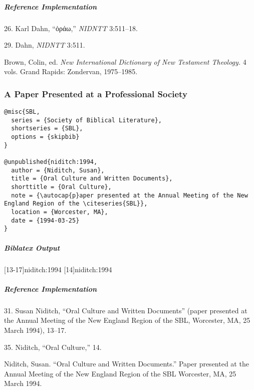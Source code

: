 \documentclass[a4paper]{article}
\newcommand{\textgreek}[1]{{\greekfont #1}}
\newenvironment{biboutput}{%
  \subparagraph{Biblatex Output}
}{\color{black}}
\newenvironment{refimp}{%
  \subparagraph{Reference Implementation}
  \color{reference-colour}
  \rm
}{\par\color{black}}
\begin{document}
\begin{refimp}
  \hspace*{\bibindent}26. Karl Dahn, “\textgreek{ὁράω},” \emph{NIDNTT} 3:511–18.

  \hspace*{\bibindent}29. Dahn, \emph{NIDNTT} 3:511.

  \hangindent\bibindent Brown, Colin, ed. \emph{New International Dictionary
  of New Testament Theology.} 4 vols. Grand Rapids: Zondervan, 1975–1985.

\end{refimp}

\subsubsection{A Paper Presented at a Professional Society}

\begin{lstlisting}
@misc{SBL,
  series = {Society of Biblical Literature},
  shortseries = {SBL},
  options = {skipbib}
}

@unpublished{niditch:1994,
  author = {Niditch, Susan},
  title = {Oral Culture and Written Documents},
  shorttitle = {Oral Culture},
  note = {\autocap{p}aper presented at the Annual Meeting of the New England Region of the \citeseries{SBL}},
  location = {Worcester, MA},
  date = {1994-03-25}
}
\end{lstlisting}

\begin{biboutput}
  [13-17]{niditch:1994}
  [14]{niditch:1994}
\end{biboutput}

\begin{refimp}
  \hspace*{\bibindent}31. Susan Niditch, “Oral Culture and Written Documents”
  (paper presented at the Annual Meeting of the New England Region of the SBL,
  Worcester, MA, 25 March 1994), 13–17.

  \hspace*{\bibindent}35. Niditch, “Oral Culture,” 14.

  \hangindent\bibindent Niditch, Susan. “Oral Culture and Written Documents.”
  Paper presented at the Annual Meeting of the New England Region of the SBL
  Worcester, MA, 25 March 1994.

\end{refimp}
\end{document}
